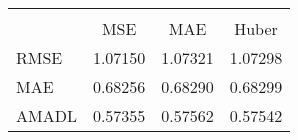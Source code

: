 \begin{tabular}{lccc}
\hline\hline \\ [-1.8ex]
 & MSE & MAE & Huber \\ 
 \hline 
RMSE & 1.07150 & 1.07321 & 1.07298 \\ 
MAE & 0.68256 & 0.68290 & 0.68299 \\ 
AMADL & 0.57355 & 0.57562 & 0.57542 \\ 
\hline\hline
\end{tabular}